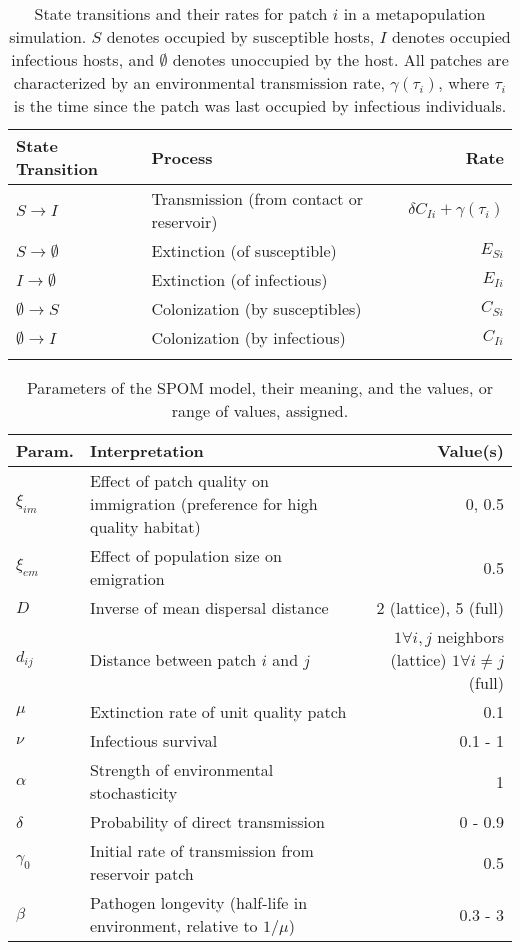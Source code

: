 \documentclass{article}
\begin{document}
\begin{table}
\caption{State transitions and their rates for patch $i$ in a metapopulation simulation.  $S$ denotes occupied by  susceptible hosts, $I$ denotes occupied infectious hosts, and $\emptyset$ denotes unoccupied by the host.  All patches are characterized by an environmental transmission rate, $\gamma(\tau_i)$, where $\tau_i$ is the time since the patch was last occupied by infectious individuals.}
\begin{tabular}{llr}
State Transition & Process &  Rate \\
\hline
$S \rightarrow I$ & Transmission (from contact or reservoir) & $\delta C_{Ii} + \gamma(\tau_i)$\\
$S \rightarrow \emptyset $ & Extinction (of susceptible) & $E_{Si}$\\
$I \rightarrow \emptyset $ & Extinction (of infectious) &  $E_{Ii}$ \\
$\emptyset \rightarrow S$ & Colonization (by susceptibles) & $C_{Si}$\\
$\emptyset \rightarrow I$ & Colonization (by infectious) & $C_{Ii}$\\
\label{transitions}
\end{tabular}
\end{table}

\begin{table}[h!]   
\caption{Parameters of the SPOM model, their meaning, and the values, or range of values, assigned.}
\begin{tabular}{p{1cm} p{6cm} r}
Param. & Interpretation &  Value(s) \\
\hline
$\xi_{im}$ & Effect of patch quality on immigration (preference for high quality habitat) & 0, 0.5 \\
$\xi_{em}$ & Effect of population size on emigration & 0.5  \\
$D$& Inverse of mean dispersal distance & 2 (lattice), 5 (full) \\
$d_{ij}$ & Distance between patch $i$ and $j$ & \parbox[t]{4cm}{\raggedleft $1 \forall i, j$ neighbors (lattice)\\ $1 \forall  i\neq j$ (full)}\\
\hline
$\mu$ & Extinction rate of unit quality patch & 0.1 \\
$\nu$ & Infectious survival & 0.1 - 1 \\
$\alpha$ & Strength of environmental stochasticity & 1 \\
\hline
$\delta$ & Probability of direct transmission & 0 - 0.9 \\
$\gamma_0$ & Initial rate of transmission from reservoir patch & 0.5\\
$\beta$ & Pathogen longevity (half-life in environment, relative to $1/\mu$) & 0.3 - 3
 \end{tabular}
\label{params}
\end{table}
\end{document}
